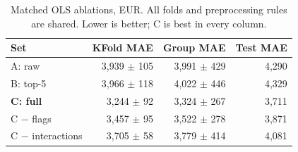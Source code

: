 \begin{table}[h!]
\centering\small\setlength{\tabcolsep}{3pt}
\begin{tabular}{lrrr}
\toprule
Set & KFold MAE & Group MAE & Test MAE\\
\midrule
A: raw & 3,939 $\pm$ 105 & 3,991 $\pm$ 429 & 4,290\\
B: top-5 & 3,966 $\pm$ 118 & 4,022 $\pm$ 446 & 4,329\\
\textbf{C: full} & 3,244 $\pm$ 92 & 3,324 $\pm$ 267 & 3,711\\
C $-$ flags & 3,457 $\pm$ 95 & 3,522 $\pm$ 278 & 3,871\\
C $-$ interactions & 3,705 $\pm$ 58 & 3,779 $\pm$ 414 & 4,081\\
\bottomrule
\end{tabular}
\caption{Matched OLS ablations, EUR. All folds and preprocessing rules are shared. Lower is better; C is best in every column.}
\label{tab:abl}
\end{table}
